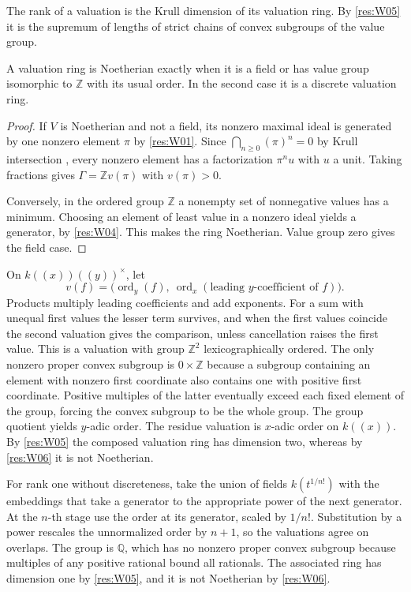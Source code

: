 The rank of a valuation is the Krull dimension of its valuation ring. By \ref{res:W05} it is the supremum of lengths of strict chains of convex subgroups of the value group.

\begin{proposition}\label{res:W06}
A valuation ring is Noetherian exactly when it is a field or has value group isomorphic to \(\mathbb Z\) with its usual order. In the second case it is a discrete valuation ring.
\end{proposition}
\begin{proof}
If \(V\) is Noetherian and not a field, its nonzero maximal ideal is generated by one nonzero element \(\pi\) by \ref{res:W01}. Since \(\bigcap_{n\ge0}(\pi)^n=0\) by Krull intersection \cite[ALG-05-C04-R04]{p103}, every nonzero element has a factorization \(\pi^n u\) with \(u\) a unit. Taking fractions gives \(\Gamma=\mathbb Z v(\pi)\) with \(v(\pi)>0\).

Conversely, in the ordered group \(\mathbb Z\) a nonempty set of nonnegative values has a minimum. Choosing an element of least value in a nonzero ideal yields a generator, by \ref{res:W04}. This makes the ring Noetherian. Value group zero gives the field case.
\end{proof}

\begin{example}\label{res:W07}
On \(k((x))((y))^\times\), let
\[
 v(f)=\bigl(\operatorname{ord}_y(f),\
       \operatorname{ord}_x(\text{leading \(y\)-coefficient of }f)\bigr).
\]
Products multiply leading coefficients and add exponents. For a sum with unequal first values the lesser term survives, and when the first values coincide the second valuation gives the comparison, unless cancellation raises the first value. This is a valuation with group \(\mathbb Z^2\) lexicographically ordered. The only nonzero proper convex subgroup is \(0\times\mathbb Z\) because a subgroup containing an element with nonzero first coordinate also contains one with positive first coordinate. Positive multiples of the latter eventually exceed each fixed element of the group, forcing the convex subgroup to be the whole group. The group quotient yields \(y\)-adic order. The residue valuation is \(x\)-adic order on \(k((x))\). By \ref{res:W05} the composed valuation ring has dimension two, whereas by \ref{res:W06} it is not Noetherian.

For rank one without discreteness, take the union of fields \(k(t^{1/n!})\) with the embeddings that take a generator to the appropriate power of the next generator. At the \(n\)-th stage use the order at its generator, scaled by \(1/n!\). Substitution by a power rescales the unnormalized order by \(n+1\), so the valuations agree on overlaps. The group is \(\mathbb Q\), which has no nonzero proper convex subgroup because multiples of any positive rational bound all rationals. The associated ring has dimension one by \ref{res:W05}, and it is not Noetherian by \ref{res:W06}.
\end{example}

